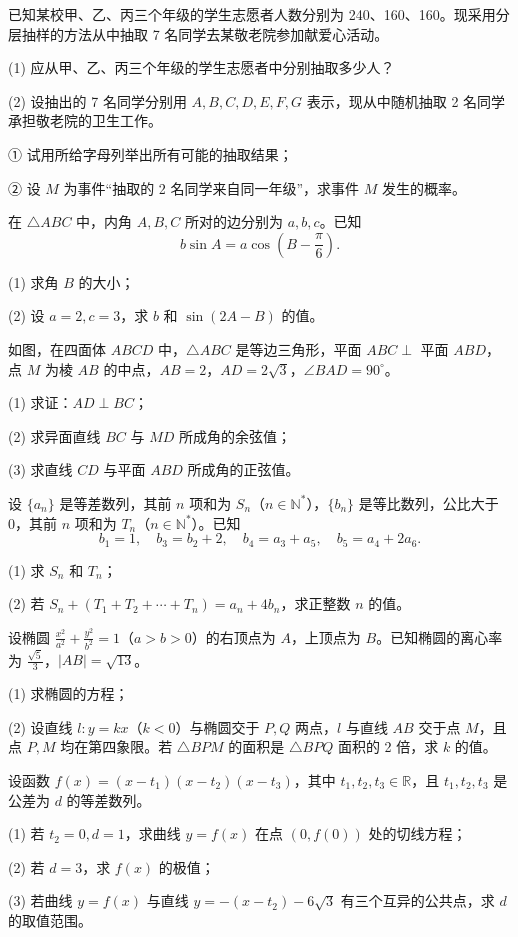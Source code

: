 \begin{question}
已知某校甲、乙、丙三个年级的学生志愿者人数分别为 240、160、160。现采用分层抽样的方法从中抽取 7 名同学去某敬老院参加献爱心活动。

(1) 应从甲、乙、丙三个年级的学生志愿者中分别抽取多少人？

(2) 设抽出的 7 名同学分别用 $A,B,C,D,E,F,G$ 表示，现从中随机抽取 2 名同学承担敬老院的卫生工作。

① 试用所给字母列举出所有可能的抽取结果；

② 设 $M$ 为事件“抽取的 2 名同学来自同一年级”，求事件 $M$ 发生的概率。

\end{question}
\begin{question}
在 $\triangle ABC$ 中，内角 $A,B,C$ 所对的边分别为 $a,b,c$。已知
\nopagebreak[4]
\[
b\sin A=a\cos\left(B-\frac\pi6\right).
\]

(1) 求角 $B$ 的大小；

(2) 设 $a=2,c=3$，求 $b$ 和 $\sin(2A-B)$ 的值。

\Needspace{0.4\textheight}
\end{question}
\begin{question}
如图，在四面体 $ABCD$ 中，$\triangle ABC$ 是等边三角形，平面 $ABC\perp$ 平面 $ABD$，点 $M$ 为棱 $AB$ 的中点，$AB=2$，$AD=2\sqrt3$，$\angle BAD=90^\circ$。
\nopagebreak[4]
\begin{center}\end{center}
\nopagebreak[4]
(1) 求证：$AD\perp BC$；

(2) 求异面直线 $BC$ 与 $MD$ 所成角的余弦值；

(3) 求直线 $CD$ 与平面 $ABD$ 所成角的正弦值。

\end{question}
\begin{question}
设 $\{a_n\}$ 是等差数列，其前 $n$ 项和为 $S_n$（$n\in\mathbb N^*$），$\{b_n\}$ 是等比数列，公比大于 0，其前 $n$ 项和为 $T_n$（$n\in\mathbb N^*$）。已知
\nopagebreak[4]
\[
b_1=1,\quad b_3=b_2+2,\quad b_4=a_3+a_5,\quad b_5=a_4+2a_6.
\]

(1) 求 $S_n$ 和 $T_n$；

(2) 若 $S_n+(T_1+T_2+\cdots+T_n)=a_n+4b_n$，求正整数 $n$ 的值。

\end{question}
\begin{question}
设椭圆 $\frac{x^2}{a^2}+\frac{y^2}{b^2}=1$（$a>b>0$）的右顶点为 $A$，上顶点为 $B$。已知椭圆的离心率为 $\frac{\sqrt5}{3}$，$|AB|=\sqrt{13}$。

(1) 求椭圆的方程；

(2) 设直线 $l:y=kx$（$k<0$）与椭圆交于 $P,Q$ 两点，$l$ 与直线 $AB$ 交于点 $M$，且点 $P,M$ 均在第四象限。若 $\triangle BPM$ 的面积是 $\triangle BPQ$ 面积的 2 倍，求 $k$ 的值。

\end{question}
\begin{question}
设函数 $f(x)=(x-t_1)(x-t_2)(x-t_3)$，其中 $t_1,t_2,t_3\in\mathbb R$，且 $t_1,t_2,t_3$ 是公差为 $d$ 的等差数列。

(1) 若 $t_2=0,d=1$，求曲线 $y=f(x)$ 在点 $(0,f(0))$ 处的切线方程；

(2) 若 $d=3$，求 $f(x)$ 的极值；

(3) 若曲线 $y=f(x)$ 与直线 $y=-(x-t_2)-6\sqrt3$ 有三个互异的公共点，求 $d$ 的取值范围。

\end{question}